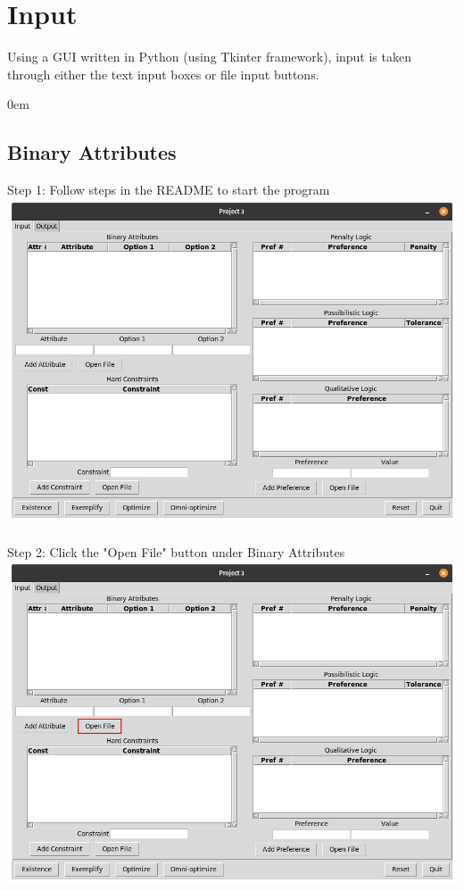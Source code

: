 \documentclass[12pt]{report}
\begin{document}
\chapter{Input}
Using a GUI written in Python (using Tkinter framework), input is taken through either the text input boxes or file input buttons.

\addtolength{\itemindent}{0.80cm}
\itemsep0em
\section{Binary Attributes}
Step 1: Follow steps in the README to start the program\\
\includegraphics[scale=0.3]{input_start} \\\\
Step 2: Click the "Open File" button under Binary Attributes\\
\includegraphics[scale=0.3]{input_attributes}\newpage
\end{document}
